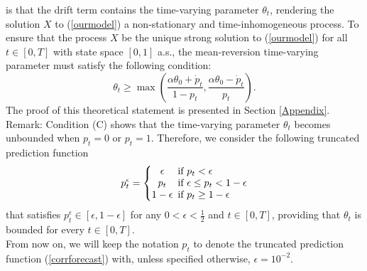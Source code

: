 \documentclass[11pt]{article}
\theoremstyle{definition}
\begin{document}
is that the drift term contains the time-varying parameter $\theta_t$, rendering the solution $X$ to (\ref{ourmodel}) a non-stationary and time-inhomogeneous process. To ensure that the process $X$ be the unique strong solution to (\ref{ourmodel}) for all $t \in [0,T]$ with state space $[0,1]$ a.s., the mean-reversion time-varying parameter must satisfy the following condition:
\begin{equation}\label{Assumption:3}
\theta_t\geq \max\left(\frac{\alpha\theta_0+\dot p_t}{1-p_t},\frac{\alpha\theta_0-\dot p_t}{p_t}\right)\tag{C}. 
\end{equation} \label{condC}
The proof of this theoretical statement is presented in Section \ref{Appendix}. \\

Remark: Condition (C) shows that the time-varying parameter $\theta_t$ becomes unbounded when $p_t = 0$ or $p_t = 1$. Therefore, we consider the following truncated prediction function
\begin{equation}
  p_t^{\epsilon} = \left\{
  \begin{array}{@{}cl@{}}
    \epsilon \!\!\!&\text{if } p_t  < \epsilon  \\
    p_t  \!\!\!&\text{if }  \epsilon \leq p_t < 1 - \epsilon \\
    1 - \epsilon  \!\!\!&\text{if }  p_t \geq 1 - \epsilon
 \end{array}\right.  \label{corrforecast}
\end{equation}
that satisfies $p_t^{\epsilon} \in [\epsilon, 1 - \epsilon]$ for any $0 < \epsilon < \frac{1}{2}$ and $t \in [0,T]$, providing that $\theta_t$ is bounded for every $t \in [0,T]$. \\
From now on, we will keep the notation $p_t$ to denote the truncated prediction function (\ref{corrforecast}) with, unless specified otherwise, $\epsilon = 10^{-2}$.
\end{document}
